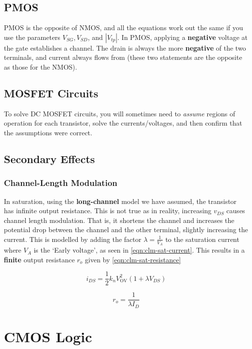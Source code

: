 \documentclass[11pt]{report}
\begin{document}
\section{PMOS}
PMOS is the opposite of NMOS, and all the equations work out the same if you use the parameters $V_{SG}, V_{SD}$, and $|V_{tp}|$. In PMOS, applying a \textbf{negative} voltage at the gate establishes a channel. The drain is always the more \textbf{negative} of the two terminals, and current always flows from  (these two statements are the opposite as those for the NMOS).

\section{MOSFET Circuits}
To solve DC MOSFET circuits, you will sometimes need to \textit{assume} regions of operation for each transistor, solve the currents/voltages, and then confirm that the assumptions were correct.

\section{Secondary Effects}

\subsection{Channel-Length Modulation}
In saturation, using the \textbf{long-channel} model we have assumed, the transistor has infinite output resistance. This is not true as in reality, increasing $v_{DS}$ causes channel length modulation. That is, it shortens the channel and increases the potential drop between the channel and the other terminal, slightly increasing the current. This is modelled by adding the factor $\lambda = \frac{1}{V_A}$ to the saturation current where $V_A$ is the `Early voltage', as seen in \ref{eqn:clm-sat-current}. This results in a \textbf{finite} output resistance $r_o$ given by \ref{eqn:clm-sat-resistance}

\begin{equation}
	\label{eqn:clm-sat-current}
	i_{DS} = \frac{1}{2}k_nV_{\text{OV}}^2 (1 + \lambda V_{DS})
\end{equation}

\begin{equation}
	\label{eqn:clm-sat-resistance}
	r_o = \frac{1}{\lambda I_{D}}
\end{equation}


\chapter{CMOS Logic}
\end{document}
